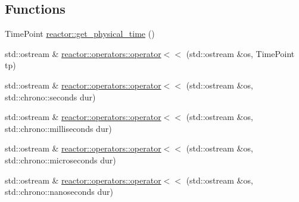 \subsection*{Functions}
\begin{DoxyCompactItemize}
\item 
Time\+Point \hyperlink{namespacereactor_a49facd170b623937b3e655518a66b868}{reactor\+::get\+\_\+physical\+\_\+time} ()
\item 
std\+::ostream \& \hyperlink{namespacereactor_1_1operators_a8ea55f33a5ed641face930e457c1f997}{reactor\+::operators\+::operator$<$$<$} (std\+::ostream \&os, Time\+Point tp)
\item 
std\+::ostream \& \hyperlink{namespacereactor_1_1operators_aac16dca80170efe903081b2b41cfda47}{reactor\+::operators\+::operator$<$$<$} (std\+::ostream \&os, std\+::chrono\+::seconds dur)
\item 
std\+::ostream \& \hyperlink{namespacereactor_1_1operators_a7bc089730a721df6047cd010af2501d2}{reactor\+::operators\+::operator$<$$<$} (std\+::ostream \&os, std\+::chrono\+::milliseconds dur)
\item 
std\+::ostream \& \hyperlink{namespacereactor_1_1operators_a279ac480746dbb8a6dcd71179df68032}{reactor\+::operators\+::operator$<$$<$} (std\+::ostream \&os, std\+::chrono\+::microseconds dur)
\item 
std\+::ostream \& \hyperlink{namespacereactor_1_1operators_ac12faa5aad6eda9a53865201264ea257}{reactor\+::operators\+::operator$<$$<$} (std\+::ostream \&os, std\+::chrono\+::nanoseconds dur)
\end{DoxyCompactItemize}
